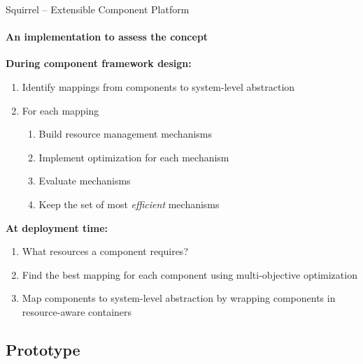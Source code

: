 \documentclass[10pt,xcolor={dvipsnames}]{beamer}
\begin{document}
	\begin{frame}{Squirrel -- Extensible Component Platform}
		\framesubtitle{An implementation to assess the concept}
		\textbf{During component framework design:}
		\begin{enumerate}
			\item Identify mappings from components to system-level abstraction
			\item For each mapping
				\begin{enumerate}[i]
					\item Build resource management mechanisms
					\item Implement optimization for each mechanism
					\item Evaluate mechanisms
					\item Keep the set of most \textit{efficient} mechanisms
				\end{enumerate}
		\end{enumerate}
		\vspace{0.5cm}
		\textbf{At deployment time:}
		\begin{enumerate}
			\item What resources a component requires?
			\item Find the best mapping for each component using multi-objective optimization
			\item Map components to system-level abstraction by wrapping components in resource-aware containers
		\end{enumerate}
	\end{frame}
	
	\subsection[Prototype]{Prototype}
	
\end{document}
